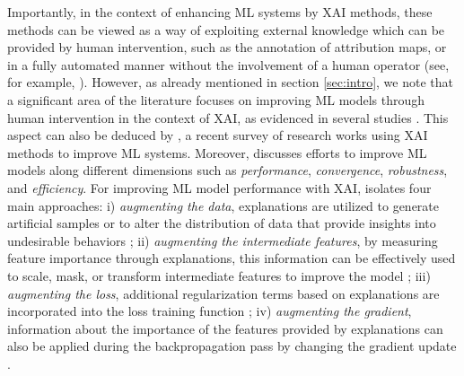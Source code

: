 Importantly, in the context of enhancing ML systems
by XAI methods, these methods can be viewed as a way of exploiting external knowledge which can be provided by human intervention, such as the annotation of  attribution maps, or in a fully automated manner without the involvement of a human operator (see, for example, \cite{hu-etal-2016-harnessing,apicella2018integration}).
However, as already mentioned in section \ref{sec:intro}, we note that a significant area of the literature focuses on improving ML models through human intervention in the context of XAI, as evidenced in several studies \citep{teso2019explanatory, schramowski2020making, hagos2022impact, ijcai2017p371, mitsuhara2019embedding, zunino2021explainable, selvaraju2019taking}.
This aspect can also be deduced by \cite{weber2022beyond}, a recent survey of research works using XAI methods to improve ML systems. Moreover, \cite{weber2022beyond} discusses efforts to improve ML models along different dimensions such as \textit{performance}, \textit{convergence}, \textit{robustness}, and \textit{efficiency}. For improving ML model performance with XAI, \cite{weber2022beyond} isolates four main approaches: %
i) \textit{augmenting the data}, explanations are utilized to generate artificial samples or to alter the distribution of data that provide insights into undesirable behaviors \citep{teso2019explanatory, schramowski2020making}; 
ii) \textit{augmenting the intermediate features}, by measuring feature importance through explanations, this information can be effectively used to scale, mask, or transform intermediate features to improve the model \citep{anders2022finding, fukui2019attention, apicella2023strategies, apicella2023shap};
iii) \textit{augmenting the loss}, additional regularization terms based on explanations are incorporated into the loss training function \citep{ijcai2017p371, ismail2021improving, liu2023icel}; 
iv) \textit{augmenting the gradient}, information about the importance of the features provided by explanations can also be applied during the backpropagation pass by changing the gradient update \citep{ha2019improvement}.
%

